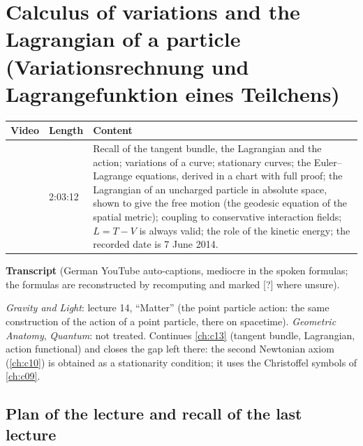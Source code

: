 \chapter{Calculus of variations and the Lagrangian of a particle (Variationsrechnung und Lagrangefunktion eines Teilchens)}\label{ch:c14}
\begin{paracol}{2}

\begin{sources}
\begin{tabularx}{\linewidth}{@{}l l L@{}}
\toprule
\textbf{Video} & \textbf{Length} & \textbf{Content}\\
\midrule
{} & 2:03:12 & Recall of the tangent bundle, the Lagrangian and the action; variations of a curve; stationary curves; the Euler--Lagrange equations, derived in a chart with full proof; the Lagrangian of an uncharged particle in absolute space, shown to give the free motion (the geodesic equation of the spatial metric); coupling to conservative interaction fields; $L=T-V$ is always valid; the role of the kinetic energy; the recorded date is 7 June 2014.\\
\bottomrule
\end{tabularx}

\smallskip
\textbf{Transcript}  (German YouTube auto-captions, mediocre in the spoken formulas; the formulas are reconstructed by recomputing and marked [?] where unsure).
\end{sources}

\begin{reading}
\emph{Gravity and Light}: lecture 14, ``Matter'' (the point particle action: the same construction of the action of a point particle, there on spacetime). \emph{Geometric Anatomy}, \emph{Quantum}: not treated.
Continues \cref{ch:c13} (tangent bundle, Lagrangian, action functional) and closes the gap left there: the second Newtonian axiom (\cref{ch:c10}) is obtained as a stationarity condition; it uses the Christoffel symbols of \cref{ch:c09}.
\end{reading}

\section{Plan of the lecture and recall of the last lecture}\label{sec:var-plan}


\end{paracol}
